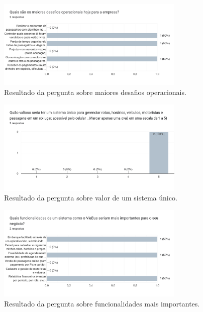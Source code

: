 \begin{apendicesenv}
  \begin{figure}[htbp]
    \centering
    \includegraphics[width=0.8\textwidth]{imagens/imagem6.png}
    \caption{Resultado da pergunta sobre maiores desafios operacionais.}
    \label{fig:resultado6}
  \end{figure}

  \begin{figure}[htbp]
    \centering
    \includegraphics[width=0.8\textwidth]{imagens/imagem7.png}
    \caption{Resultado da pergunta sobre valor de um sistema único.}
    \label{fig:resultado7}
  \end{figure}

  \begin{figure}[htbp]
    \centering
    \includegraphics[width=0.8\textwidth]{imagens/imagem8.png}
    \caption{Resultado da pergunta sobre funcionalidades mais importantes.}
    \label{fig:resultado8}
  \end{figure}


\end{apendicesenv}
